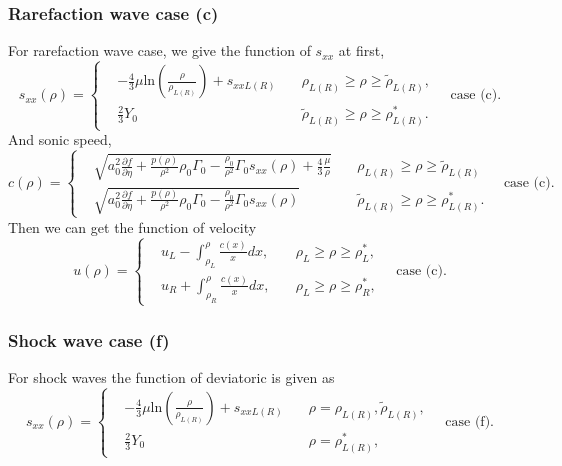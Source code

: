 \documentclass[review]{elsarticle}
\begin{document}
\subsubsection{Rarefaction wave case (c)}
For rarefaction wave case,
we give the function of $s_{xx}$ at first,
\begin{equation}
  s_{xx}(\rho) = \left\{\begin{aligned}
	& -\frac{4}{3}\mu\text{ln}\left(\frac{\rho}{\rho_{L(R)}}\right)+s_{xxL(R)} \quad  & \rho_{L(R)} \ge \rho \ge \tilde{\rho}_{L(R)}  ,\\
	& \frac{2}{3}Y_0 & \tilde{\rho}_{L(R)} \ge \rho \ge \rho_{L(R)}^* .
  \end{aligned} \right. \quad \text{case (c)}.
  \end{equation}
And sonic speed,
\begin{equation}
  c(\rho) = \left\{ \begin{aligned}
	&  \sqrt{a_0^2 \frac{\partial f}{\partial \eta} + \frac{p(\rho)}{\rho^2}\rho_0\Gamma_0 -\frac{\rho_0}{\rho^2}\Gamma_0 s_{xx}(\rho) +\frac{4}{3}\frac{\mu}{\rho}} \quad  & \rho_{L(R)} \ge \rho \ge \tilde{\rho}_{L(R)}\\
	&	\sqrt{a_0^2 \frac{\partial f}{\partial \eta} + \frac{p(\rho)}{\rho^2}\rho_0\Gamma_0 -\frac{\rho_0}{\rho^2}\Gamma_0 s_{xx}(\rho)}  \quad  &   \tilde{\rho}_{L(R)} \ge \rho \ge \rho_{L(R)}^*.
  \end{aligned}\right. \quad \text{case (c)}.
\end{equation}
Then we can get  the   function of  velocity
\begin{equation}
  u(\rho) =\left\{ \begin{aligned} 
	&u_L - \int_{\rho_L}^{\rho} \frac{c(x)}{x} dx, \quad &  \rho_L\ge \rho\ge \rho_L^* , \\
	&u_R + \int_{\rho_R}^{\rho} \frac{c(x)}{x} dx, \quad &  \rho_L\ge \rho\ge  \rho_R^* , 
	\end{aligned}
  \right. \quad \text{case (c)}.
\end{equation}
\subsubsection{Shock wave case (f)}
For shock waves the function of deviatoric is given as 
\begin{equation}
  s_{xx}(\rho) = \left\{\begin{aligned}
  & -\frac{4}{3}\mu\text{ln}\left(\frac{\rho}{\rho_{L(R)}}\right)+s_{xxL(R)}\quad &  \rho =\rho_{L(R)}, \tilde{\rho}_{L(R)},\\
	& \frac{2}{3}Y_0 &\rho = \rho_{L(R)}^*,
  \end{aligned} \right. \quad  \text{case (f)}.
  \end{equation}
\end{document}
